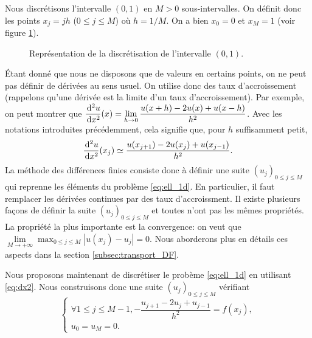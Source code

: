 \documentclass[12pt,a4paper,twoside]{article}
\begin{document}
Nous discr\'etisons l'intervalle $(0,1)$ en $M>0$ sous-intervalles.
On d\'efinit donc les points $x_j = j h$ ($0 \leq j \leq M$) o\`u $h = 1/M$.
On a bien $x_0 = 0$ et $x_M = 1$ (voir figure \ref{fig:disc_x}).

\begin{figure}
\centering
{} 
\caption{Repr\'esentation de la discr\'etisation de l'intervalle $(0,1)$.}
\label{fig:disc_x}
\end{figure}


\'Etant donn\'e que nous ne disposons que de valeurs en certains points, on ne peut
pas d\'efinir de d\'eriv\'ees au sens usuel. On utilise donc des taux d'accroissement
(rappelons qu'une d\'eriv\'ee est la limite d'un taux d'accroissement).
Par exemple, on peut montrer que 
$\dfrac{\!\;\mathrm{d}^2 u}{\!\;\mathrm{d} x^2}(x) 
= \lim\limits_{h \to 0} \dfrac{u(x+h) - 2 u(x) + u(x-h)}{h^2}$.
Avec les notations introduites pr\'ec\'edemment, cela signifie que,
pour $h$ suffisamment petit, 
\begin{align}
  \label{eq:dx2}
  \dfrac{\!\;\mathrm{d}^2 u}{\!\;\mathrm{d} x^2}(x_j) \simeq \dfrac{u(x_{j+1}) - 2 u(x_j) + u(x_{j-1})}{h^2} .
\end{align}
La m\'ethode des diff\'erences finies consiste donc \`a d\'efinir une suite $(u_j)_{0\leq j \leq M}$
qui reprenne les \'el\'ements du probl\`eme \eqref{eq:ell_1d}. En particulier, il faut remplacer
les d\'eriv\'ees continues par des taux d'accroissment.
Il existe plusieurs fa\c{c}ons de d\'efinir la suite $(u_j)_{0\leq j \leq M}$ et toutes
n'ont pas les m\^emes propri\'et\'es. La propri\'et\'e la plus importante est la convergence:
on veut que $\lim\limits_{M \to +\infty} \max_{0 \leq j \leq M} | u(x_j) - u_j | = 0$.
Nous aborderons plus en d\'etails ces aspects dans la section \ref{subsec:transport_DF}.


Nous proposons maintenant de discr\'etiser le prob\`eme \eqref{eq:ell_1d}
en utilisant \eqref{eq:dx2}.
Nous construisons donc une suite $(u_j)_{0\leq j \leq M}$ v\'erifiant
\begin{equation}
  \label{eq:ell_DF}
  \left\{
    \begin{array}{l}
      \forall 1 \leq j \leq M-1 , - \dfrac{u_{j+1} - 2 u_j + u_{j-1}}{h^2} = f(x_j) ,
      \\
      u_0 = u_M = 0 .
    \end{array}
  \right.
\end{equation}
\end{document}
